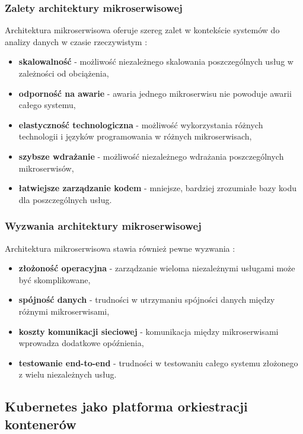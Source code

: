 \subsubsection{Zalety architektury mikroserwisowej}
\label{subsubsec:zalety_mikroserwisow}

Architektura mikroserwisowa oferuje szereg zalet w kontekście systemów do analizy danych w czasie rzeczywistym \cite{microservice_benefits}:

\begin{itemize}
    \item \textbf{skalowalność} - możliwość niezależnego skalowania poszczególnych usług w zależności od obciążenia,
    \item \textbf{odporność na awarie} - awaria jednego mikroserwisu nie powoduje awarii całego systemu,
    \item \textbf{elastyczność technologiczna} - możliwość wykorzystania różnych technologii i języków programowania w różnych mikroserwisach,
    \item \textbf{szybsze wdrażanie} - możliwość niezależnego wdrażania poszczególnych mikroserwisów,
    \item \textbf{łatwiejsze zarządzanie kodem} - mniejsze, bardziej zrozumiałe bazy kodu dla poszczególnych usług.
\end{itemize}

\subsubsection{Wyzwania architektury mikroserwisowej}
\label{subsubsec:wyzwania_mikroserwisow}

Architektura mikroserwisowa stawia również pewne wyzwania \cite{microservice_challenges}:

\begin{itemize}
    \item \textbf{złożoność operacyjna} - zarządzanie wieloma niezależnymi usługami może być skomplikowane,
    \item \textbf{spójność danych} - trudności w utrzymaniu spójności danych między różnymi mikroserwisami,
    \item \textbf{koszty komunikacji sieciowej} - komunikacja między mikroserwisami wprowadza dodatkowe opóźnienia,
    \item \textbf{testowanie end-to-end} - trudności w testowaniu całego systemu złożonego z wielu niezależnych usług.
\end{itemize}

\subsection{Kubernetes jako platforma orkiestracji kontenerów}
\label{subsec:kubernetes}


